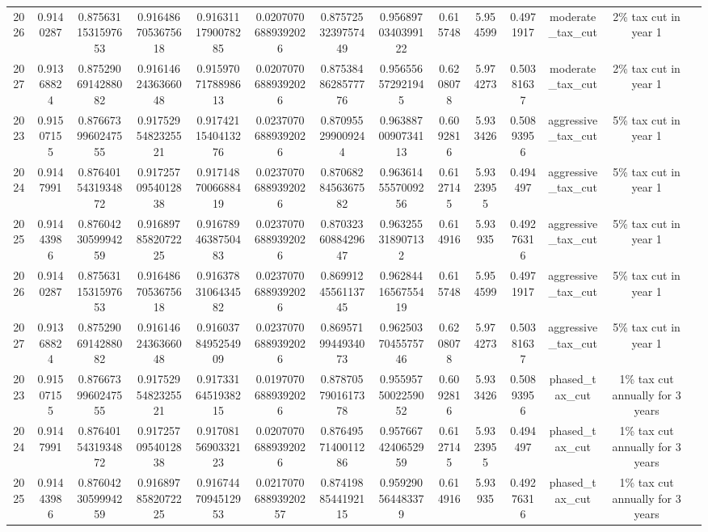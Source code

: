 \begin{sidewaystable}
\begin{tabular}{|c|c|c|c|c|c|c|c|c|c|c|c|c|c|}
2026 & 0.9140287 & 0.8756311531597653 & 0.9164867053675618 & 0.9163111790078285 & 0.02070706889392026 & 0.8757253239757449 & 0.9568970340399122 & 0.615748 & 5.954599 & 0.4971917 & moderate\_tax\_cut & 2\% tax cut in year 1 \\
2027 & 0.91368824 & 0.8752906914288082 & 0.9161462436366048 & 0.9159707178898613 & 0.02070706889392026 & 0.8753848628577776 & 0.956556572921945 & 0.6208078 & 5.974273 & 0.50381637 & moderate\_tax\_cut & 2\% tax cut in year 1 \\
\hline
2023 & 0.91507155 & 0.8766739960247555 & 0.9175295482325521 & 0.9174211540413276 & 0.02370706889392026 & 0.870955299009244 & 0.9638870090734113 & 0.6092816 & 5.933426 & 0.50893956 & aggressive\_tax\_cut & 5\% tax cut in year 1 \\
2024 & 0.9147991 & 0.8764015431934872 & 0.9172570954012838 & 0.9171487006688419 & 0.02370706889392026 & 0.8706828456367582 & 0.9636145557009256 & 0.6127145 & 5.9323955 & 0.494497 & aggressive\_tax\_cut & 5\% tax cut in year 1 \\
2025 & 0.91443986 & 0.8760423059994259 & 0.9168978582072225 & 0.9167894638750483 & 0.02370706889392026 & 0.8703236088429647 & 0.963255318907132 & 0.614916 & 5.93935 & 0.49276316 & aggressive\_tax\_cut & 5\% tax cut in year 1 \\
2026 & 0.9140287 & 0.8756311531597653 & 0.9164867053675618 & 0.9163783106434582 & 0.02370706889392026 & 0.8699124556113745 & 0.9628441656755419 & 0.615748 & 5.954599 & 0.4971917 & aggressive\_tax\_cut & 5\% tax cut in year 1 \\
2027 & 0.91368824 & 0.8752906914288082 & 0.9161462436366048 & 0.9160378495254909 & 0.02370706889392026 & 0.8695719944934073 & 0.9625037045575746 & 0.6208078 & 5.974273 & 0.50381637 & aggressive\_tax\_cut & 5\% tax cut in year 1 \\
\hline
2023 & 0.91507155 & 0.8766739960247555 & 0.9175295482325521 & 0.9173316451938215 & 0.01970706889392026 & 0.8787057901617378 & 0.9559575002259052 & 0.6092816 & 5.933426 & 0.50893956 & phased\_tax\_cut & 1\% tax cut annually for 3 years \\
2024 & 0.9147991 & 0.8764015431934872 & 0.9172570954012838 & 0.9170815690332123 & 0.02070706889392026 & 0.8764957140011286 & 0.9576674240652959 & 0.6127145 & 5.9323955 & 0.494497 & phased\_tax\_cut & 1\% tax cut annually for 3 years \\
2025 & 0.91443986 & 0.8760423059994259 & 0.9168978582072225 & 0.9167447094512953 & 0.021707068893920257 & 0.8741988544192115 & 0.959290564483379 & 0.614916 & 5.93935 & 0.49276316 & phased\_tax\_cut & 1\% tax cut annually for 3 years \\

\end{tabular}
\end{sidewaystable}
